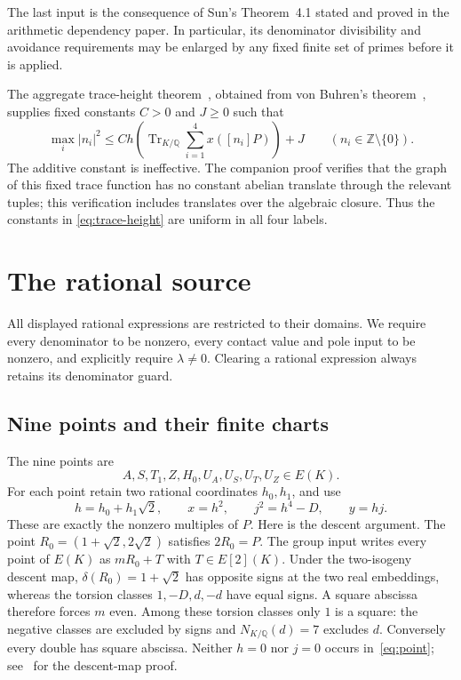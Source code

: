 \documentclass[11pt,a4paper]{article}
\newcommand{\Q}{\mathbb Q}\newcommand{\Z}{\mathbb Z}
\DeclareMathOperator{\Tr}{Tr}
\begin{document}
The last input is the consequence of Sun's Theorem~4.1 stated and proved
in the arithmetic dependency paper. In particular, its denominator
divisibility and avoidance requirements may be enlarged by any fixed
finite set of primes before it is applied.

The aggregate trace-height theorem~\cite{Aggregate}, obtained from
von Buhren's theorem~\cite{VonBuhren}, supplies fixed constants
$C>0$ and $J\ge0$ such that
\begin{equation}\label{eq:trace-height}
 \max_i|n_i|^2\le C h\left(\Tr_{K/\Q}
              \sum_{i=1}^4x([n_i]P)\right)+J
 \qquad(n_i\in\Z\setminus\{0\}).
\end{equation}
The additive constant is ineffective. The companion proof verifies
that the graph of this fixed trace function has no constant abelian
translate through the relevant tuples; this verification includes
translates over the algebraic closure. Thus the constants in
\eqref{eq:trace-height} are uniform in all four labels.

\section{The rational source}

All displayed rational expressions are restricted to their domains.
We require every denominator to be nonzero, every contact value and
pole input to be nonzero, and explicitly require $\lambda\ne0$.
Clearing a rational expression always retains its denominator guard.

\subsection{Nine points and their finite charts}

The nine points are
\[
 A,S,T_1,Z,H_0,U_A,U_S,U_T,U_Z\in E(K).
\]
For each point retain two rational coordinates $h_0,h_1$, and use
\begin{equation}\label{eq:point}
 h=h_0+h_1\sqrt2,\qquad x=h^2,\qquad j^2=h^4-D,
 \qquad y=hj.
\end{equation}
These are exactly the nonzero multiples of $P$. Here is the descent
argument. The point $R_0=(1+\sqrt2,2\sqrt2)$ satisfies $2R_0=P$.
The group input writes every point of $E(K)$ as $mR_0+T$ with
$T\in E[2](K)$. Under the two-isogeny descent map,
$\delta(R_0)=1+\sqrt2$ has opposite signs at the two real embeddings,
whereas the torsion classes $1,-D,d,-d$ have equal signs. A square
abscissa therefore forces $m$ even. Among these torsion classes only
$1$ is a square: the negative classes are excluded by signs and
$N_{K/\Q}(d)=7$ excludes $d$. Conversely every double has square
abscissa. Neither $h=0$ nor $j=0$ occurs in~\eqref{eq:point};
see~\cite{SquareCharts} for the descent-map proof.
\end{document}
